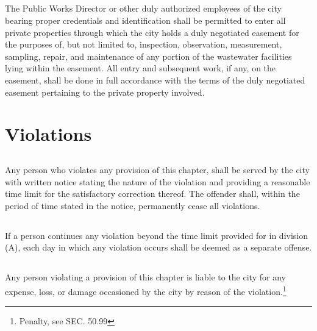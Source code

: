 \subsection{}
The Public Works Director or other duly authorized employees of the city bearing proper credentials and identification shall be permitted to enter all private properties through which the city holds a duly negotiated easement for the purposes of, but not limited to, inspection, observation, measurement, sampling, repair, and maintenance of any portion of the wastewater facilities lying within the easement.  All entry and subsequent work, if any, on the easement, shall be done in full accordance with the terms of the duly negotiated easement pertaining to the private property involved.

\section{Violations}
\subsection{}
Any person who violates any provision of this chapter, shall be served by the city with written notice stating the nature of the violation and providing a reasonable time limit for the satisfactory correction thereof.  The offender shall, within the period of time stated in the notice, permanently cease all violations.
\subsection{}
If a person continues any violation beyond the time limit provided for in division (A), each day in which any violation occurs shall be deemed as a separate offense.
\subsection{}
Any person violating a provision of this chapter is liable to the city for any expense, loss, or damage occasioned by the city by reason of the violation.\footnote{Penalty, see SEC. 50.99}
